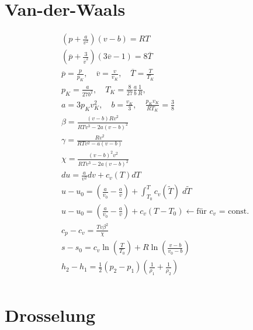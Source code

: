 \documentclass[twocolumn]{article}
\begin{document}
\section{Van-der-Waals}
\begin{align*}
	&\left(p + \frac{a}{v^2}\right)(v-b) = RT 
	\\
	&\left(\overline{p} + \frac{3}{\overline{v}^2}\right)(3\overline{v}-1) = 8\overline{T} 
	\\
	&\overline{p} = \frac{p}{p_K}, \quad \overline{v} = \frac{v}{v_K}, \quad \overline{T} = \frac{T}{T_K} 
	\\
	&p_K = \frac{a}{27b^2}, \quad T_K = \frac{8}{27}\frac{a}{b}\frac{1}{R}, \quad %
	\\
	&a=3p_Kv^2_K, \quad b =\frac{v_K}{3}, \quad \frac{p_Kv_K}{RT_K} = \frac{3}{8} 
	\\
	&\beta = \frac{(v-b)Rv^2}{RTv^3 - 2a(v-b)^2} 
	\\ 
	&\gamma = \frac{Rv^2}{RTv^2 - a(v-b)} 
	\\
	&\chi = \frac{(v-b)^2v^2}{RTv^3 - 2a(v-b)^2} 
	\\
	& du = \frac{a}{v^2}dv + c_v(T)dT 
	\\
	&u-u_0 = \left( \frac{a}{v_0} - \frac{a}{v} \right) + \int_{T_0}^{T} c_v(\tilde{T})\; d\tilde{T} 
	\\
	& u - u_0 = \left(\frac{a}{v_0} - \frac{a}{v} \right) + c_v(T-T_0) \leftarrow \text{für $c_v$ = const.} 
	\\
	&c_p - c_v = \frac{Tv\beta^2}{\chi} 
	\\
	& s- s_0 = c_v \ln \left( \frac{T}{T_0} \right) + R \ln \left(\frac{v-b}{v_0 - b} \right)
	\\
	& h_2 - h_1 = \frac{1}{2}(p_2 - p_1) \left( \frac{1}{\rho_1} + \frac{1}{\rho_2}\right)
	\\
\end{align*}

\section{Drosselung}
\end{document}
